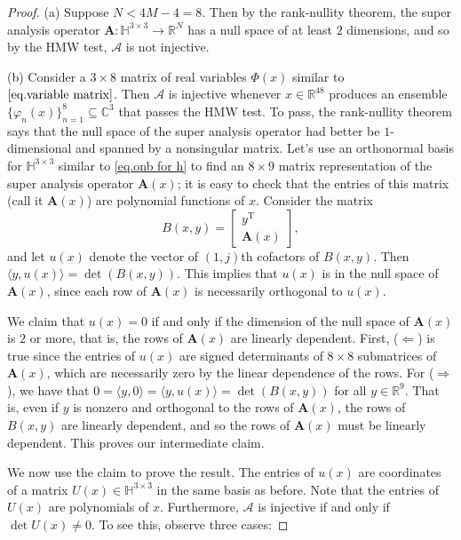 \documentclass[times,10pt]{elsarticle}
\theoremstyle{plain}
\begin{document}
\begin{proof}
(a)
Suppose $N<4M-4=8$.
Then by the rank-nullity theorem, the super analysis operator $\mathbf{A}\colon\mathbb{H}^{3\times 3}\rightarrow\mathbb{R}^N$ has a null space of at least $2$ dimensions, and so by the HMW test, $\mathcal{A}$ is not injective.

(b)
Consider a $3\times 8$ matrix of real variables $\Phi(x)$ similar to $\eqref{eq.variable matrix}$.
Then $\mathcal{A}$ is injective whenever $x\in\mathbb{R}^{48}$ produces an ensemble $\{\varphi_n(x)\}_{n=1}^8\subseteq\mathbb{C}^3$ that passes the HMW test.
To pass, the rank-nullity theorem says that the null space of the super analysis operator had better be $1$-dimensional and spanned by a nonsingular matrix.
Let's use an orthonormal basis for $\mathbb{H}^{3\times 3}$ similar to \eqref{eq.onb for h} to find an $8\times 9$ matrix representation of the super analysis operator $\mathbf{A}(x)$; it is easy to check that the entries of this matrix (call it $\mathbf{A}(x)$) are polynomial functions of $x$.
Consider the matrix
\begin{equation*}
B(x,y)=
\left[
\begin{array}{c}
y^\mathrm{T}\\
\mathbf{A}(x)
\end{array}
\right],
\end{equation*}
and let $u(x)$ denote the vector of $(1,j)$th cofactors of $B(x,y)$.
Then $\langle y,u(x)\rangle=\det(B(x,y))$.
This implies that $u(x)$ is in the null space of $\mathbf{A}(x)$, since each row of $\mathbf{A}(x)$ is necessarily orthogonal to $u(x)$.

We claim that $u(x)=0$ if and only if the dimension of the null space of $\mathbf{A}(x)$ is $2$ or more, that is, the rows of $\mathbf{A}(x)$ are linearly dependent.
First, ($\Leftarrow$) is true since the entries of $u(x)$ are signed determinants of $8\times 8$ submatrices of $\mathbf{A}(x)$, which are necessarily zero by the linear dependence of the rows. 
For ($\Rightarrow$), we have that $0=\langle y,0\rangle=\langle y,u(x)\rangle=\det(B(x,y))$ for all $y\in\mathbb{R}^9$.
That is, even if $y$ is nonzero and orthogonal to the rows of $\mathbf{A}(x)$, the rows of $B(x,y)$ are linearly dependent, and so the rows of $\mathbf{A}(x)$ must be linearly dependent.
This proves our intermediate claim.

We now use the claim to prove the result.
The entries of $u(x)$ are coordinates of a matrix $U(x)\in\mathbb{H}^{3\times 3}$ in the same basis as before.
Note that the entries of $U(x)$ are polynomials of $x$.
Furthermore, $\mathcal{A}$ is injective if and only if $\det U(x)\neq0$.
To see this, observe three cases:


\end{proof}
\end{document}
